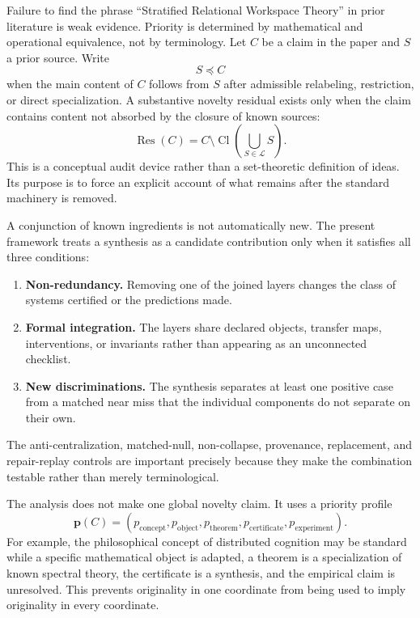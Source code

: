 
Failure to find the phrase ``Stratified Relational Workspace Theory'' in prior
literature is weak evidence. Priority is determined by mathematical and
operational equivalence, not by terminology. Let \(C\) be a claim in the
paper and \(S\) a prior source. Write
\[
S\preccurlyeq C
\]
when the main content of \(C\) follows from \(S\) after admissible relabeling,
restriction, or direct specialization. A substantive novelty residual exists
only when the claim contains content not absorbed by the closure of known
sources:
\[
\operatorname{Res}(C)
=
C\setminus
\operatorname{Cl}
\left(
\bigcup_{S\in\mathcal L}S
\right).
\]
This is a conceptual audit device rather than a set-theoretic definition of
ideas. Its purpose is to force an explicit account of what remains after the
standard machinery is removed.


A conjunction of known ingredients is not automatically new. The present
framework treats a synthesis as a candidate contribution only when it satisfies
all three conditions:
\begin{enumerate}
\item \textbf{Non-redundancy.} Removing one of the joined layers changes the
 class of systems certified or the predictions made.
\item \textbf{Formal integration.} The layers share declared objects,
 transfer maps, interventions, or invariants rather than appearing as an
 unconnected checklist.
\item \textbf{New discriminations.} The synthesis separates at least one
 positive case from a matched near miss that the individual components do
 not separate on their own.
\end{enumerate}
The anti-centralization, matched-null, non-collapse, provenance, replacement,
and repair-replay controls are important precisely because they make the
combination testable rather than merely terminological.


The analysis does not make one global novelty claim. It uses a priority
profile
\[
\boxed{
\mathbf p(C)
=
\left(
 p_{\mathrm{concept}},
 p_{\mathrm{object}},
 p_{\mathrm{theorem}},
 p_{\mathrm{certificate}},
 p_{\mathrm{experiment}}
\right).
}
\]
For example, the philosophical concept of distributed cognition may be
standard while a specific mathematical object is adapted, a theorem is a
specialization of known spectral theory, the certificate is a synthesis, and
the empirical claim is unresolved. This prevents originality in one
coordinate from being used to imply originality in every coordinate.

